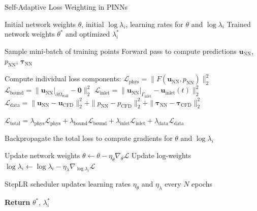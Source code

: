 \documentclass[12pt, a4paper]{article}
\begin{document}
\begin{algorithm}[htbp]
    \caption{Self-Adaptive Loss Weighting in PINNs}
    \label{alg:self_adaptive_weighting}
    \begin{algorithmic}[1]
    \Require Initial network weights $\theta$, initial $\log \lambda_i$, learning rates for $\theta$ and $\log \lambda_i$
    \Ensure Trained network weights $\theta^*$ and optimized $\lambda_i^*$
    
        \State Sample mini-batch of training points
        \State Forward pass to compute predictions $\mathbf{u}_{\mathrm{NN}}$, $p_{\mathrm{NN}}$, $\boldsymbol{\tau}_{\mathrm{NN}}$
        
        \State Compute individual loss components:
            \State \quad $\mathcal{L}_{\mathrm{phys}} = \|F(\mathbf{u}_{\mathrm{NN}}, p_{\mathrm{NN}})\|_2^2$
            \State \quad $\mathcal{L}_{\mathrm{bound}} = \|\mathbf{u}_{\mathrm{NN}}|_{\partial\Omega_{\mathrm{wall}}} - \mathbf{0}\|_2^2$
            \State \quad $\mathcal{L}_{\mathrm{inlet}} = \|\mathbf{u}_{\mathrm{NN}}|_{\Gamma_{\mathrm{inlet}}} - \mathbf{u}_{\mathrm{inlet}}(t)\|_2^2$
            \State \quad $\mathcal{L}_{\mathrm{data}} = \|\mathbf{u}_{\mathrm{NN}} - \mathbf{u}_{\mathrm{CFD}}\|_2^2 + \|p_{\mathrm{NN}} - p_{\mathrm{CFD}}\|_2^2 + \|\boldsymbol{\tau}_{\mathrm{NN}} - \boldsymbol{\tau}_{\mathrm{CFD}}\|_2^2$
        
        \State \quad $\mathcal{L}_{\mathrm{total}} = \lambda_{\mathrm{phys}} \mathcal{L}_{\mathrm{phys}} + \lambda_{\mathrm{bound}} \mathcal{L}_{\mathrm{bound}} + \lambda_{\mathrm{inlet}} \mathcal{L}_{\mathrm{inlet}} + \lambda_{\mathrm{data}} \mathcal{L}_{\mathrm{data}}$
        
        \State Backpropagate the total loss to compute gradients for $\theta$ and $\log \lambda_i$
        
        \State Update network weights $\theta \gets \theta - \eta_{\theta} \nabla_{\theta} \mathcal{L}$
        \State Update log-weights $\log \lambda_i \gets \log \lambda_i - \eta_{\lambda} \nabla_{\log \lambda_i} \mathcal{L}$
        
        \State StepLR scheduler updates learning rates $\eta_{\theta}$ and $\eta_{\lambda}$ every $N$ epochs
    \EndWhile
    
    \State \textbf{Return} $\theta^*$, $\lambda_i^*$
    \end{algorithmic}
\end{algorithm}
\end{document}
